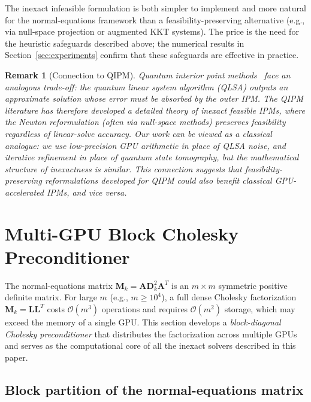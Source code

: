 \documentclass[11pt,twoside]{article}
\newtheorem{remark}{Remark}[section]
\newcommand{\bA}{\mathbf{A}}
\newcommand{\bD}{\mathbf{D}}
\newcommand{\bL}{\mathbf{L}}
\newcommand{\bM}{\mathbf{M}}
\newcommand{\cO}{\mathcal{O}}
\begin{document}
The inexact infeasible formulation is both simpler to implement and more
natural for the normal-equations framework than a feasibility-preserving
alternative (e.g., via null-space projection or augmented KKT systems).
The price is the need for the heuristic safeguards described above; the
numerical results in Section~\ref{sec:experiments} confirm that these
safeguards are effective in practice.

\begin{remark}[Connection to QIPM]
  Quantum interior point methods~\cite{Kerenidis2020} face an analogous
  trade-off: the quantum linear system algorithm (QLSA) outputs an
  approximate solution whose error must be absorbed by the outer IPM.
  The QIPM literature has therefore developed a detailed theory of
  inexact \emph{feasible} IPMs, where the Newton reformulation (often via
  null-space methods) preserves feasibility regardless of linear-solve
  accuracy.  Our work can be viewed as a classical analogue: we use
  low-precision GPU arithmetic in place of QLSA noise, and iterative
  refinement in place of quantum state tomography, but the mathematical
  structure of inexactness is similar.  This connection suggests that
  feasibility-preserving reformulations developed for QIPM could also
  benefit classical GPU-accelerated IPMs, and vice versa.
\end{remark}

\section{Multi-GPU Block Cholesky Preconditioner}
\label{sec:precond}

The normal-equations matrix $\bM_k = \bA\bD_k^2\bA^T$ is an $m \times m$
symmetric positive definite matrix.  For large $m$ (e.g., $m \ge 10^4$),
a full dense Cholesky factorization $\bM_k = \bL\bL^T$ costs $\cO(m^3)$
operations and requires $\cO(m^2)$ storage, which may exceed the memory of
a single GPU.  This section develops a \emph{block-diagonal Cholesky
preconditioner} that distributes the factorization across multiple GPUs
and serves as the computational core of all the inexact solvers described
in this paper.

\subsection{Block partition of the normal-equations matrix}
\end{document}
